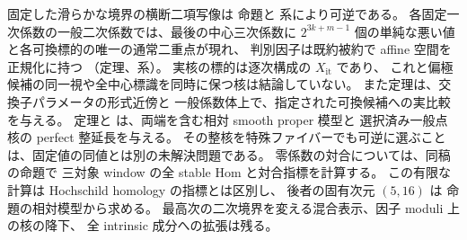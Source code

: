 固定した滑らかな境界の横断二項写像は
命題と
系により可逆である。
各固定一次係数の一般二次係数では、最後の中心三次係数に
$2^{3k+m-1}$ 個の単純な悪い値と各可換標的の唯一の通常二重点が現れ、
判別因子は既約被約で affine 空間を正規化に持つ
（定理、系）。
実核の標的は逐次構成の $X_{\mathrm{it}}$ であり、
これと偏極候補の同一視や全中心標識を同時に保つ核は結論していない。
また定理は、交換子パラメータの形式近傍と
一般係数体上で、指定された可換候補への実比較を与える。
定理と
は、両端を含む相対 smooth proper 模型と
選択済み一般点核の perfect 整延長を与える。
その整核を特殊ファイバーでも可逆に選ぶことは、固定値の同値とは別の未解決問題である。
零係数の対合については、同稿の命題で
三対象 window の全 stable Hom と対合指標を計算する。
この有限な計算は Hochschild homology の指標とは区別し、
後者の固有次元 $(5,16)$ は
命題の相対模型から求める。
最高次の二次境界を変える混合表示、因子 moduli 上の核の降下、
全 intrinsic 成分への拡張は残る。

\PaperReferenceGuide
